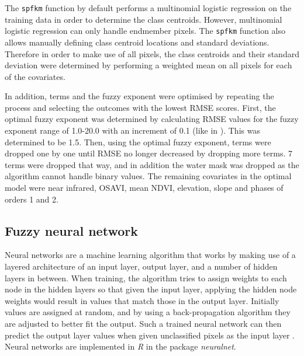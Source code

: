 \documentclass[a4paper,10pt]{book}
\begin{document}
The \texttt{spfkm} function by default performs a multinomial logistic regression on the training data in order to determine the class centroids. However, multinomial logistic regression can only handle endmember pixels. The \texttt{spfkm} function also allows manually defining class centroid locations and standard deviations. Therefore in order to make use of all pixels, the class centroids and their standard deviation were determined by performing a weighted mean on all pixels for each of the covariates.

In addition, terms and the fuzzy exponent were optimised by repeating the process and selecting the outcomes with the lowest RMSE scores.  First, the optimal fuzzy exponent was determined by calculating RMSE values for the fuzzy exponent range of 1.0-20.0 with an increment of 0.1 (like in \citet{Okeke2006fuzzyexponent}). This was determined to be 1.5. Then, using the optimal fuzzy exponent, terms were dropped one by one until RMSE no longer decreased by dropping more terms. 7 terms were dropped that way, and in addition the water mask was dropped as the algorithm cannot handle binary values. The remaining covariates in the optimal model were near infrared, OSAVI, mean NDVI, elevation, slope and phases of orders 1 and 2.

\subsection{Fuzzy neural network}

Neural networks are a machine learning algorithm that works by making use of a layered architecture of an input layer, output layer, and a number of hidden layers in between. When training, the algorithm tries to assign weights to each node in the hidden layers so that given the input layer, applying the hidden node weights would result in values that match those in the output layer. Initially values are assigned at random, and by using a back-propagation algorithm they are adjusted to better fit the output. Such a trained neural network can then predict the output layer values when given unclassified pixels as the input layer \citep{foody1997fuzzynnet}. Neural networks are implemented in \textit{R} in the package \textit{neuralnet}.
\end{document}
